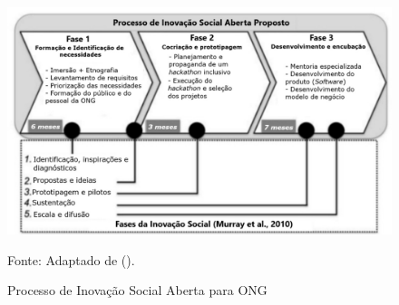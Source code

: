 \begin{figure}[H]
    \caption{Processo de Inovação Social Aberta para \gls{ONG}}
    \centering
    \includegraphics[width=\linewidth]{images/fundamentacao/isaong.png}
    \label{fig:isaong}
    
    Fonte: Adaptado de \citeauthor{gama2023} (\citeyear{gama2023}).
\end{figure}